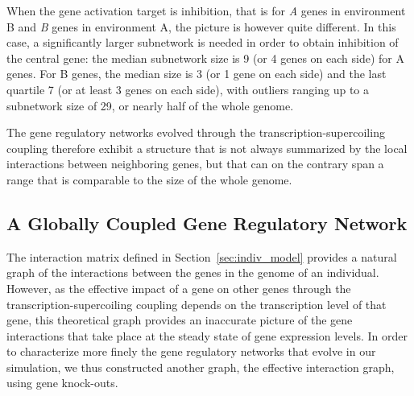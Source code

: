 When the gene activation target is inhibition, that is for \emph{A} genes in environment B and \emph{B} genes in environment A, the picture is however quite different.
In this case, a significantly larger subnetwork is needed in order to obtain inhibition of the central gene: the median subnetwork size is 9 (or 4 genes on each side) for A genes.
For B genes, the median size is 3 (or 1 gene on each side) and the last quartile 7 (or at least 3 genes on each side), with outliers ranging up to a subnetwork size of 29, or nearly half of the whole genome.

The gene regulatory networks evolved through the transcription-supercoiling coupling therefore exhibit a structure that is not always summarized by the local interactions between neighboring genes, but that can on the contrary span a range that is comparable to the size of the whole genome.


\subsection{A Globally Coupled Gene Regulatory Network}

The interaction matrix defined in Section~\ref{sec:indiv_model} provides a natural graph of the interactions between the genes in the genome of an individual.
However, as the effective impact of a gene on other genes through the transcription-supercoiling coupling depends on the transcription level of that gene, this theoretical graph provides an inaccurate picture of the gene interactions that take place at the steady state of gene expression levels.
In order to characterize more finely the gene regulatory networks that evolve in our simulation, we thus constructed another graph, the effective interaction graph, using gene knock-outs.

